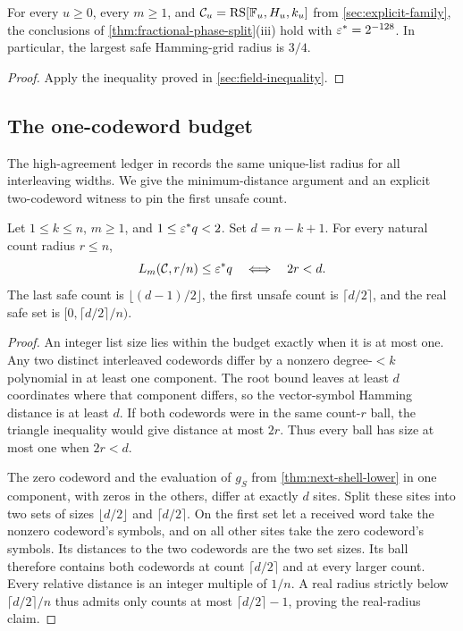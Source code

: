 \begin{corollary}
\label{cor:explicit-family-list}
For every \(u\ge0\), every \(m\ge1\), and
\(\mathcal C_u=\operatorname{RS}[\mathbb{F}_u,H_u,k_u]\) from
\cref{sec:explicit-family}, the conclusions of
\cref{thm:fractional-phase-split}\textup{(iii)} hold with
\(\varepsilon^\ast=2^{-128}\).  In
particular, the largest safe Hamming-grid radius is \(3/4\).
\end{corollary}

\begin{proof}
Apply the inequality proved in \cref{sec:field-inequality}.
\end{proof}

\subsection{The one-codeword budget}

The high-agreement ledger in \cite{chojecki2026results} records the same
unique-list radius for all interleaving widths. We give the minimum-distance
argument and an explicit two-codeword witness to pin the first unsafe count.

\begin{theorem}
\label{thm:one-codeword-budget}
Let \(1\le k\le n\), \(m\ge1\), and \(1\le\varepsilon^\ast q<2\). Set
\(d=n-k+1\). For every natural count radius \(r\le n\),
\[
  L_m(\mathcal C,r/n)\le\varepsilon^\ast q
  \quad\Longleftrightarrow\quad
  2r<d.
\]
The last safe count is \(\lfloor(d-1)/2\rfloor\), the first unsafe count
is \(\lceil d/2\rceil\), and the real safe set is
\([0,\lceil d/2\rceil/n)\).
\end{theorem}

\begin{proof}
An integer list size lies within the budget exactly when it is at most one.
Any two distinct interleaved codewords differ by a nonzero degree-\(<k\)
polynomial in at least one component. The root bound leaves at least
\(d\) coordinates where that component differs, so the vector-symbol
Hamming distance is at least \(d\). If both codewords were in the same
count-\(r\) ball, the triangle inequality would give distance at most
\(2r\). Thus every ball has size at most one when \(2r<d\).

The zero codeword and the evaluation of \(g_S\) from
\cref{thm:next-shell-lower} in one component, with zeros in the others,
differ at exactly \(d\) sites. Split these sites into two sets of sizes
\(\lfloor d/2\rfloor\) and \(\lceil d/2\rceil\). On the first set let a
received word take the nonzero codeword's symbols, and on all other sites
take the zero codeword's symbols. Its distances to the two codewords
are the two set sizes. Its ball therefore contains both codewords at
count \(\lceil d/2\rceil\) and at every larger count. Every relative
distance is an integer multiple of \(1/n\). A real radius strictly below
\(\lceil d/2\rceil/n\) thus admits only counts at most
\(\lceil d/2\rceil-1\), proving the real-radius claim.
\end{proof}

